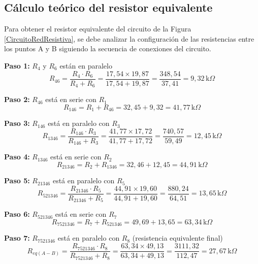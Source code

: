 \documentclass[12pt,a4paper]{article}
\begin{document}
\subsection{Cálculo teórico del resistor equivalente}

Para obtener el resistor equivalente del circuito de la Figura \ref{CircuitoRedResistiva}, se debe analizar la configuración de las resistencias entre los puntos A y B siguiendo la secuencia de conexiones del circuito.

\textbf{Paso 1:} $R_4$ y $R_6$ están en paralelo
\begin{equation}
R_{46} = \frac{R_4 \cdot R_6}{R_4 + R_6} = \frac{17,54 \times 19,87}{17,54 + 19,87} = \frac{348,54}{37,41} = 9,32 \, \mathrm{k}\Omega
\end{equation}

\textbf{Paso 2:} $R_{46}$ está en serie con $R_1$
\begin{equation}
R_{146} = R_1 + R_{46} = 32,45 + 9,32 = 41,77 \, \mathrm{k}\Omega
\end{equation}

\textbf{Paso 3:} $R_{146}$ está en paralelo con $R_3$
\begin{equation}
R_{1346} = \frac{R_{146} \cdot R_3}{R_{146} + R_3} = \frac{41,77 \times 17,72}{41,77 + 17,72} = \frac{740,57}{59,49} = 12,45 \, \mathrm{k}\Omega
\end{equation}

\textbf{Paso 4:} $R_{1346}$ está en serie con $R_2$
\begin{equation}
R_{21346} = R_2 + R_{1346} = 32,46 + 12,45 = 44,91 \, \mathrm{k}\Omega
\end{equation}

\textbf{Paso 5:} $R_{21346}$ está en paralelo con $R_5$
\begin{equation}
R_{521346} = \frac{R_{21346} \cdot R_5}{R_{21346} + R_5} = \frac{44,91 \times 19,60}{44,91 + 19,60} = \frac{880,24}{64,51} = 13,65 \, \mathrm{k}\Omega
\end{equation}

\textbf{Paso 6:} $R_{521346}$ está en serie con $R_7$
\begin{equation}
R_{7521346} = R_7 + R_{521346} = 49,69 + 13,65 = 63,34 \, \mathrm{k}\Omega
\end{equation}

\textbf{Paso 7:} $R_{7521346}$ está en paralelo con $R_8$ (resistencia equivalente final)
\begin{equation}
R_{eq(A-B)} = \frac{R_{7521346} \cdot R_8}{R_{7521346} + R_8} = \frac{63,34 \times 49,13}{63,34 + 49,13} = \frac{3111,32}{112,47} = 27,67 \, \mathrm{k}\Omega
\end{equation}
\end{document}
